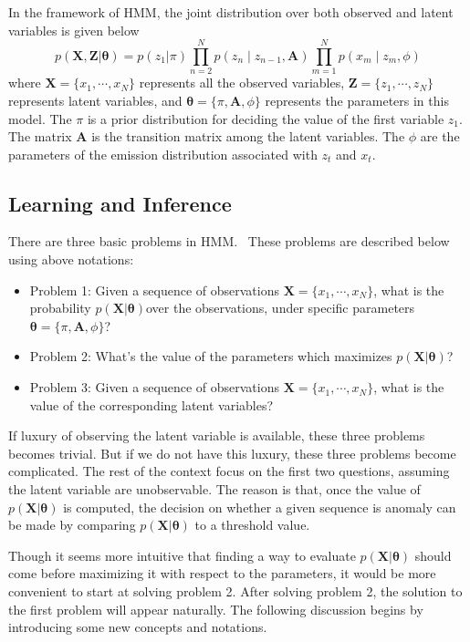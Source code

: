 In the framework of HMM, the joint distribution over both observed and latent variables is given below
\begin{equation}
	p(\mathbf{X}, \mathbf{Z} | \boldsymbol{\theta}) = p(z_1 | \pi) \prod_{n=2}^{N}p(z_n\mid z_{n-1}, \mathbf{A}) \prod_{m=1}^{N}p(x_m\mid z_m, \phi)
	\label{eq:HMMcomplete}
\end{equation}
where \(\mathbf{X} = \{x_1, \cdots, x_N\}\) represents all the observed variables, \(\mathbf{Z} = \{z_1, \cdots, z_N\}\) represents latent variables, and \(\boldsymbol{\theta} = \{\pi, \mathbf{A}, \phi\}\) represents the parameters in this model. The \(\pi\) is a prior distribution for deciding the value of the first variable \(z_1\). The matrix \(\mathbf{A}\) is the transition matrix among the latent variables. The \(\phi\) are the parameters of the emission distribution associated with \(z_t\) and \(x_t\).

\subsection{Learning and Inference}
There are three basic problems in HMM.~\cite{rabiner1989tutorial}  These problems are described below using above notations:
\begin{itemize}
	\item Problem 1: Given a sequence of observations \(\mathbf{X} = \{x_1, \cdots, x_N\}\), what is the probability \(p(\mathbf{X} | \boldsymbol{\theta}) 			  \)over the observations, under specific parameters \(\boldsymbol{\theta} = \{\pi, \mathbf{A}, \phi\}\)?
	\item Problem 2: What's the value of the parameters which maximizes \(p(\mathbf{X} | \boldsymbol{\theta})\)?
	\item Problem 3: Given a sequence of observations \(\mathbf{X} = \{x_1, \cdots, x_N\}\), what is the value of the corresponding latent variables?
\end{itemize}
If luxury of observing the latent variable is available, these three problems becomes trivial. But if we do not have this luxury, these three problems become complicated. The rest of the context focus on the first two questions, assuming the latent variable are unobservable. The reason is that, once the value of \(p(\mathbf{X} | \boldsymbol{\theta})\) is computed, the decision on whether a given sequence is anomaly can be made by comparing \(p(\mathbf{X} | \boldsymbol{\theta})\) to a threshold value.

Though it seems more intuitive that finding a way to evaluate \(p(\mathbf{X} | \boldsymbol{\theta})\) should come before maximizing it with respect to the parameters, it would be more convenient to start at solving problem 2. After solving problem 2, the solution to the first problem will appear naturally. The following discussion begins by introducing some new concepts and notations.


